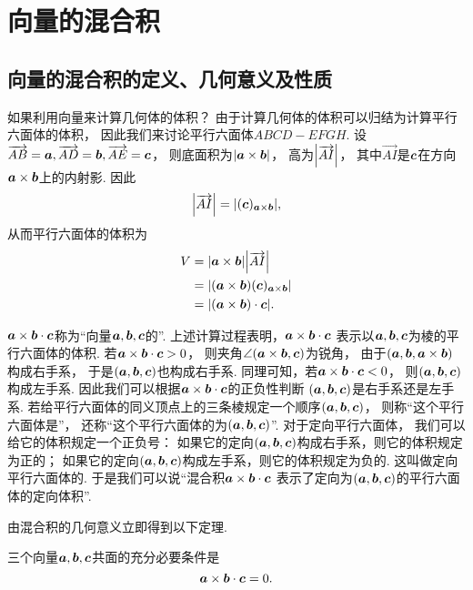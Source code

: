 \section{向量的混合积}
\subsection{向量的混合积的定义、几何意义及性质}
如果利用向量来计算几何体的体积？
由于计算几何体的体积可以归结为计算平行六面体的体积，
因此我们来讨论平行六面体\(ABCD-EFGH\).
设\(\overrightarrow{AB}=\boldsymbol{a},
\overrightarrow{AD}=\boldsymbol{b},
\overrightarrow{AE}=\boldsymbol{c}\)，
则底面积为\(\abs{\boldsymbol{a}\times\boldsymbol{b}}\)，
高为\(\abs{\overrightarrow{AI}}\)，
其中\(\vec{AI}\)是\(\boldsymbol{c}\)在方向\(\boldsymbol{a}\times\boldsymbol{b}\)上的内射影.
因此\[
	\abs{\overrightarrow{AI}}
	= \abs{(\boldsymbol{c})_{\boldsymbol{a}\times\boldsymbol{b}}},
\]
从而平行六面体的体积为
\begin{align*}
	V &= \abs{\boldsymbol{a}\times\boldsymbol{b}} \abs{\overrightarrow{AI}} \\
	&= \abs{(\boldsymbol{a}\times\boldsymbol{b}) (\boldsymbol{c})_{\boldsymbol{a}\times\boldsymbol{b}}} \\
	&= \abs{(\boldsymbol{a}\times\boldsymbol{b})\cdot\boldsymbol{c}}.
\end{align*}

\(\boldsymbol{a}\times\boldsymbol{b}\cdot\boldsymbol{c}\)称为“向量\(\boldsymbol{a},\boldsymbol{b},\boldsymbol{c}\)的”.
上述计算过程表明，\(\boldsymbol{a}\times\boldsymbol{b}\cdot\boldsymbol{c}\)
表示以\(\boldsymbol{a},\boldsymbol{b},\boldsymbol{c}\)为棱的平行六面体的体积.
若\(\boldsymbol{a}\times\boldsymbol{b}\cdot\boldsymbol{c}>0\)，
则夹角\(\angle(\boldsymbol{a}\times\boldsymbol{b},\boldsymbol{c})\)为锐角，
由于\((\boldsymbol{a},\boldsymbol{b},\boldsymbol{a}\times\boldsymbol{b})\)构成右手系，
于是\((\boldsymbol{a},\boldsymbol{b},\boldsymbol{c})\)也构成右手系.
同理可知，若\(\boldsymbol{a}\times\boldsymbol{b}\cdot\boldsymbol{c}<0\)，
则\((\boldsymbol{a},\boldsymbol{b},\boldsymbol{c})\)构成左手系.
因此我们可以根据\(\boldsymbol{a}\times\boldsymbol{b}\cdot\boldsymbol{c}\)的正负性判断
\((\boldsymbol{a},\boldsymbol{b},\boldsymbol{c})\)是右手系还是左手系.
若给平行六面体的同义顶点上的三条棱规定一个顺序\((\boldsymbol{a},\boldsymbol{b},\boldsymbol{c})\)，
则称“这个平行六面体是”，
还称“这个平行六面体的为\((\boldsymbol{a},\boldsymbol{b},\boldsymbol{c})\)”.
对于定向平行六面体，
我们可以给它的体积规定一个正负号：
如果它的定向\((\boldsymbol{a},\boldsymbol{b},\boldsymbol{c})\)构成右手系，则它的体积规定为正的；
如果它的定向\((\boldsymbol{a},\boldsymbol{b},\boldsymbol{c})\)构成左手系，则它的体积规定为负的.
这叫做定向平行六面体的.
于是我们可以说“混合积\(\boldsymbol{a}\times\boldsymbol{b}\cdot\boldsymbol{c}\)
表示了定向为\((\boldsymbol{a},\boldsymbol{b},\boldsymbol{c})\)的平行六面体的定向体积”.

由混合积的几何意义立即得到以下定理.
\begin{theorem}
三个向量\(\boldsymbol{a},\boldsymbol{b},\boldsymbol{c}\)共面的充分必要条件是\[
	\boldsymbol{a}\times\boldsymbol{b}\cdot\boldsymbol{c} = 0.
\]
\end{theorem}

